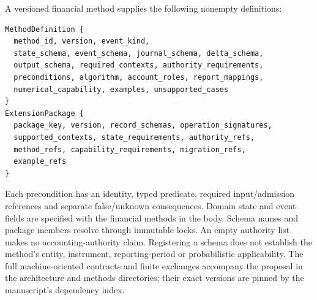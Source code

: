 A versioned financial method supplies the following nonempty definitions:
\begin{lstlisting}
MethodDefinition {
  method_id, version, event_kind,
  state_schema, event_schema, journal_schema, delta_schema,
  output_schema, required_contexts, authority_requirements,
  preconditions, algorithm, account_roles, report_mappings,
  numerical_capability, examples, unsupported_cases
}
ExtensionPackage {
  package_key, version, record_schemas, operation_signatures,
  supported_contexts, state_requirements, authority_refs,
  method_refs, capability_requirements, migration_refs,
  example_refs
}
\end{lstlisting}
Each precondition has an identity, typed predicate, required input/admission
references and separate false/unknown consequences. Domain state and event
fields are specified with the financial methods in the body. Schema names and
package members resolve through immutable locks. An empty authority list makes
no accounting-authority claim. Registering a schema does not establish the
method's entity, instrument, reporting-period or probabilistic applicability.
The full machine-oriented contracts and finite exchanges accompany the proposal
in the architecture and methods directories; their exact versions are pinned
by the manuscript's dependency index.
